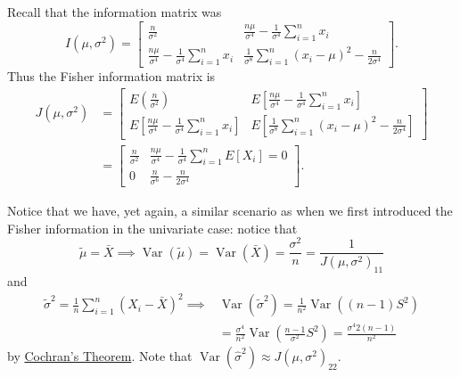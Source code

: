 \documentclass[notoc,notitlepage]{tufte-book}
\DeclareMathOperator{\Var}{Var }
\begin{document}
\begin{solution}
  Recall that the information matrix was
  \begin{equation*}
    I\left(\mu, \sigma^2\right) = \begin{bmatrix}
      \frac{n}{\sigma^2} & \frac{n\mu}{\sigma^4} - \frac{1}{\sigma^4} \sum_{i=1}^{n} x_i \\
      \frac{n\mu}{\sigma^4} - \frac{1}{\sigma^4} \sum_{i=1}^{n} x_i & \frac{1}{\sigma^8} \sum_{i=1}^{n} (x_i - \mu)^2 - \frac{n}{2\sigma^4}
    \end{bmatrix}.
  \end{equation*}
  Thus the Fisher information matrix is
  \begin{align*}
    J\left(\mu, \sigma^2\right) &= \begin{bmatrix}
      E\left( \frac{n}{\sigma^2} \right) & E\left[ \frac{n\mu}{\sigma^4} - \frac{1}{\sigma^4} \sum_{i=1}^{n} x_i \right] \\
      E\left[ \frac{n\mu}{\sigma^4} - \frac{1}{\sigma^4} \sum_{i=1}^{n} x_i \right] & E\left[ \frac{1}{\sigma^8} \sum_{i=1}^{n} (x_i - \mu)^2 - \frac{n}{2 \sigma^4} \right]
    \end{bmatrix} \\
    &= \begin{bmatrix}
    \frac{n}{\sigma^2} & \frac{n \mu}{\sigma^4} - \frac{1}{\sigma^4} \sum_{i=1}^{n} E[X_i] = 0 \\
    0 & \frac{n}{\sigma^6} - \frac{n}{2\sigma^4}
    \end{bmatrix}.
  \end{align*}
\end{solution}

\begin{note}
  Notice that we have, yet again, a similar scenario as when we first introduced the Fisher information in the univariate case: notice that
  \begin{equation*}
    \tilde{\mu} = \bar{X} \implies \Var(\tilde{\mu}) = \Var(\bar{X}) = \frac{\sigma^2}{n} = \frac{1}{J\left(\mu, \sigma^2\right)_{11}}
  \end{equation*}
  and
  \begin{align*}
    \tilde{\sigma}^2 = \frac{1}{n} \sum_{i=1}^{n} (X_i - \bar{X})^2 \implies& \Var\left(\tilde{ \sigma }^2\right) = \frac{1}{n^2} \Var\left((n - 1)S^2\right) \\
                                                                            &= \frac{\sigma^4}{n^2} \Var\left(\frac{n - 1}{\sigma^2} S^2\right) = \frac{\sigma^4 2(n - 1)}{n^2}
  \end{align*}
  by \hyperref[thm:properties_of_the_gaussian_distribution]{Cochran's Theorem}. Note that $\Var\left(\hat{\sigma}^2\right) \approx J(\mu, \sigma^2)_{22}$.
\end{note}
\end{document}

